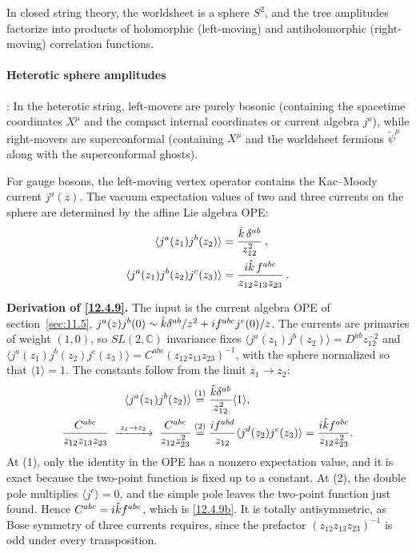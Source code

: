 In closed string theory, the worldsheet is a sphere $S^{2}$, and the tree amplitudes factorize into products of holomorphic (left-moving) and antiholomorphic (right-moving) correlation functions.

\paragraph*{Heterotic sphere amplitudes}: In the heterotic string, left-movers are purely bosonic (containing the spacetime coordinates $X^{\mu}$ and the compact internal coordinates or current algebra $j^{a}$), while right-movers are superconformal (containing $X^{\mu}$ and the worldsheet fermions $\tilde{\psi}^{\mu}$ along with the superconformal ghosts).

For gauge bosons, the left-moving vertex operator contains the Kac--Moody current $j^{a}(z)$. The vacuum expectation values of two and three currents on the sphere are determined by the affine Lie algebra OPE:
\begin{subequations} \label{12.4.9}
	\begin{align}
		\langle j^{a}(z_{1})j^{b}(z_{2})\rangle &= \frac{\hat{k}\,\delta^{ab}}{z_{12}^{2}} \:, \label{12.4.9a} \\
		\langle j^{a}(z_{1})j^{b}(z_{2})j^{c}(z_{3})\rangle &= \frac{i\hat{k}\,f^{abc}}{z_{12}z_{13}z_{23}} \:. \label{12.4.9b}
	\end{align}
\end{subequations}
\begin{tcolorbox}[breakable]
	\begin{remark}
		\textbf{Derivation of \eqref{12.4.9}.} The input is the current algebra OPE of section~\ref{sec:11.5}, $j^{a}(z)j^{b}(0)\sim\hat k\delta^{ab}/z^{2}+i f^{abc}j^{c}(0)/z$. The currents are primaries of weight $(1,0)$, so $SL(2,\mathbb C)$ invariance fixes $\langle j^{a}(z_{1})j^{b}(z_{2})\rangle=D^{ab}z_{12}^{-2}$ and $\langle j^{a}(z_{1})j^{b}(z_{2})j^{c}(z_{3})\rangle=C^{abc}(z_{12}z_{13}z_{23})^{-1}$, with the sphere normalized so that $\langle 1\rangle=1$. The constants follow from the limit $z_{1}\to z_{2}$:
		\begin{align*}
			\langle j^{a}(z_{1})j^{b}(z_{2})\rangle &\overset{(1)}{=} \frac{\hat k\delta^{ab}}{z_{12}^{2}}\langle1\rangle ,\\
			\frac{C^{abc}}{z_{12}z_{13}z_{23}}\;\xrightarrow{\;z_{1}\to z_{2}\;}\;\frac{C^{abc}}{z_{12}z_{23}^{2}}
			&\overset{(2)}{=} \frac{i f^{abd}}{z_{12}}\langle j^{d}(z_{2})j^{c}(z_{3})\rangle=\frac{i\hat k f^{abc}}{z_{12}z_{23}^{2}} .
		\end{align*}
		At (1), only the identity in the OPE has a nonzero expectation value, and it is exact because the two-point function is fixed up to a constant. At (2), the double pole multiplies $\langle j^{c}\rangle=0$, and the simple pole leaves the two-point function just found. Hence $C^{abc}=i\hat k f^{abc}$, which is \eqref{12.4.9b}. It is totally antisymmetric, as Bose symmetry of three currents requires, since the prefactor $(z_{12}z_{13}z_{23})^{-1}$ is odd under every transposition.
	\end{remark}
\end{tcolorbox}

